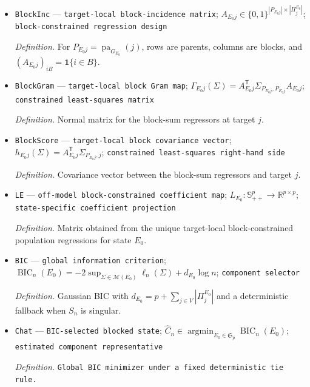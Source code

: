 \documentclass{article}
\begin{document}
\begin{itemize}
  \par\smallskip\noindent\emph{Definition.} \texttt{Empirical covariance matrix under known zero mean.}
  \item \texttt{BlockInc} --- \texttt{target-\allowbreak{}local block-\allowbreak{}incidence matrix}; \(A_{E_0j}\in\{0,1\}^{|P_{E_0j}|\times|\Pi^{E_0}_j|}\); \texttt{block-\allowbreak{}constrained regression design}
  \par\smallskip\noindent\emph{Definition.} For \(P_{E_0j}=\operatorname{pa}_{G_{E_0}}(j)\), rows are parents, columns are blocks, and \((A_{E_0j})_{iB}=\mathbf 1\{i\in B\}\).
  \item \texttt{BlockGram} --- \texttt{target-\allowbreak{}local block Gram map}; \(\Gamma_{E_0j}(\Sigma)=A_{E_0j}^{\mathsf T}\Sigma_{P_{E_0j},P_{E_0j}}A_{E_0j}\); \texttt{constrained least-\allowbreak{}squares matrix}
  \par\smallskip\noindent\emph{Definition.} Normal matrix for the block-sum regressors at target \(j\).
  \item \texttt{BlockScore} --- \texttt{target-\allowbreak{}local block covariance vector}; \(h_{E_0j}(\Sigma)=A_{E_0j}^{\mathsf T}\Sigma_{P_{E_0j},j}\); \texttt{constrained least-\allowbreak{}squares right-\allowbreak{}hand side}
  \par\smallskip\noindent\emph{Definition.} Covariance vector between the block-sum regressors and target \(j\).
  \item \texttt{LE} --- \texttt{off-\allowbreak{}model block-\allowbreak{}constrained coefficient map}; \(L_{E_0}:\mathbb S^p_{++}\to\mathbb R^{p\times p}\); \texttt{state-\allowbreak{}specific coefficient projection}
  \par\smallskip\noindent\emph{Definition.} Matrix obtained from the unique target-local block-constrained population regressions for state \(E_0\).
  \item \texttt{BIC} --- \texttt{global information criterion}; \(\operatorname{BIC}_n(E_0)=-2\sup_{\Sigma\in\mathcal M(E_0)}\ell_n(\Sigma)+d_{E_0}\log n\); \texttt{component selector}
  \par\smallskip\noindent\emph{Definition.} Gaussian BIC with \(d_{E_0}=p+\sum_{j\in V}|\Pi^{E_0}_j|\) and a deterministic fallback when \(S_n\) is singular.
  \item \texttt{Chat} --- \texttt{BIC-\allowbreak{}selected blocked state}; \(\widehat C_n\in\operatorname*{argmin}_{E_0\in\mathfrak S_p}\operatorname{BIC}_n(E_0)\); \texttt{estimated component representative}
  \par\smallskip\noindent\emph{Definition.} \texttt{Global BIC minimizer under a fixed deterministic tie rule.}

\end{itemize}
\end{document}
